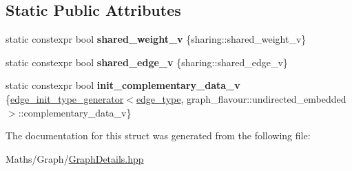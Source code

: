 \subsection*{Static Public Attributes}
\begin{DoxyCompactItemize}
\item 
\mbox{\label{structsequoia_1_1maths_1_1graph__impl_1_1edge__type__generator_3_01graph__flavour_1_1undirected_9e17ae143379e09deb5ba438fa684125_ad5e902776c358892361f5f57da9ec931}} 
static constexpr bool {\bfseries shared\+\_\+weight\+\_\+v} \{sharing\+::shared\+\_\+weight\+\_\+v\}
\item 
\mbox{\label{structsequoia_1_1maths_1_1graph__impl_1_1edge__type__generator_3_01graph__flavour_1_1undirected_9e17ae143379e09deb5ba438fa684125_ae36d563072652f569cb4c9e6c24a206b}} 
static constexpr bool {\bfseries shared\+\_\+edge\+\_\+v} \{sharing\+::shared\+\_\+edge\+\_\+v\}
\item 
\mbox{\label{structsequoia_1_1maths_1_1graph__impl_1_1edge__type__generator_3_01graph__flavour_1_1undirected_9e17ae143379e09deb5ba438fa684125_a544ee46ed3c576177d099bc1c8c6bfb8}} 
static constexpr bool {\bfseries init\+\_\+complementary\+\_\+data\+\_\+v} \{\mbox{\hyperlink{structsequoia_1_1maths_1_1graph__impl_1_1edge__init__type__generator}{edge\+\_\+init\+\_\+type\+\_\+generator}}$<$\mbox{\hyperlink{classsequoia_1_1maths_1_1embedded__partial__edge}{edge\+\_\+type}}, graph\+\_\+flavour\+::undirected\+\_\+embedded$>$\+::complementary\+\_\+data\+\_\+v\}
\end{DoxyCompactItemize}


The documentation for this struct was generated from the following file\+:\begin{DoxyCompactItemize}
\item 
Maths/\+Graph/\mbox{\hyperlink{_graph_details_8hpp}{Graph\+Details.\+hpp}}\end{DoxyCompactItemize}
